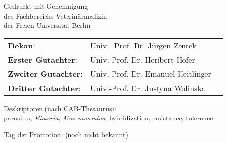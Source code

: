 \begin{center}
Gedruckt mit Genehmigung \\
des Fachbereichs Veterinärmedizin \\
der Freien Universität Berlin
\end{center}

\vspace{2cm}

\begin{tabular}{ l l l } 
\textbf{Dekan}: & Univ.- Prof. Dr. J\"urgen Zentek \\
\textbf{Erster Gutachter}: & Univ.-Prof. Dr. Heribert Hofer \\
\textbf{Zweiter Gutachter}: & Univ.-Prof. Dr. Emanuel Heitlinger \\
\textbf{Dritter Gutachter}: & Univ.-Prof. Dr. Justyna Wolinska \\
\end{tabular}

\vspace{2cm}

Deskriptoren (nach CAB-Thesaurus):\\
parasites, \textit{Eimeria}, \textit{Mus musculus}, hybridization, resistance, tolerance

\vspace{2cm}

Tag der Promotion: (noch nicht bekannt)
